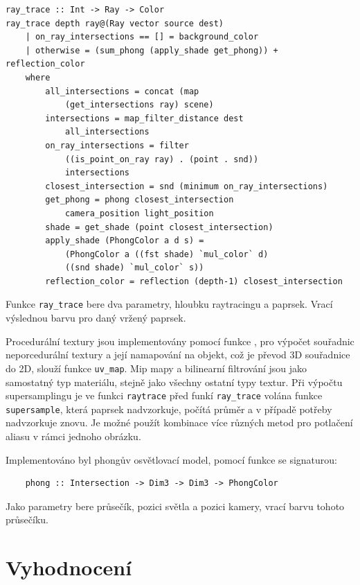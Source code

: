 \documentclass[a4paper, 12pt]{article}
\begin{document}
\begin{verbatim}
ray_trace :: Int -> Ray -> Color 
ray_trace depth ray@(Ray vector source dest)  
    | on_ray_intersections == [] = background_color
    | otherwise = (sum_phong (apply_shade get_phong)) + reflection_color 
    where
        all_intersections = concat (map 
            (get_intersections ray) scene)
        intersections = map_filter_distance dest 
            all_intersections
        on_ray_intersections = filter 
            ((is_point_on_ray ray) . (point . snd)) 
            intersections
        closest_intersection = snd (minimum on_ray_intersections) 
        get_phong = phong closest_intersection 
            camera_position light_position
        shade = get_shade (point closest_intersection)
        apply_shade (PhongColor a d s) = 
            (PhongColor a ((fst shade) `mul_color` d) 
            ((snd shade) `mul_color` s))
        reflection_color = reflection (depth-1) closest_intersection
\end{verbatim}

Funkce \texttt{ray\_trace} bere dva parametry, hloubku raytracingu a paprsek. Vrací výslednou barvu pro daný vržený paprsek.

Procedurální textury jsou implementovány pomocí funkce \texttt{}, pro výpočet souřadnic neporcedurální textury a její namapování na objekt,
což je převod 3D souřadnice do 2D, slouží funkce \texttt{uv\_map}. Mip mapy a bilinearní filtrování jsou jako samostatný typ materiálu, stejně jako všechny
ostatní typy textur. Při výpočtu supersamplingu je ve funkci \texttt{raytrace} před funkí \texttt{ray\_trace}
volána funkce \texttt{supersample}, která paprsek nadvzorkuje, počítá průměr a v případě potřeby nadvzorkuje znovu. Je možné použít kombinace
více různých metod pro potlačení aliasu v rámci jednoho obrázku.

Implementováno byl phongův osvětlovací model, pomocí funkce se signaturou: 
\begin{verbatim}
    phong :: Intersection -> Dim3 -> Dim3 -> PhongColor 
\end{verbatim}
Jako parametry bere průsečík, pozici světla a pozici kamery, vrací barvu tohoto průsečíku.


\section{Vyhodnocení}
\end{document}
